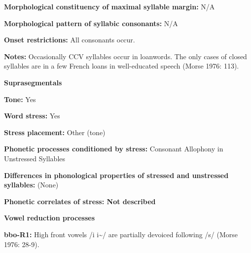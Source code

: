 \begin{styleBody}
\textbf{Morphological constituency of maximal syllable margin:} N/A
\end{styleBody}

\begin{styleBody}
\textbf{Morphological pattern of syllabic consonants:} N/A
\end{styleBody}

\begin{styleBody}
\textbf{Onset restrictions:} All consonants occur.
\end{styleBody}

\begin{styleBody}
\textbf{Notes: }Occasionally CCV syllables occur in loanwords. The only cases of closed syllables are in a few French loans in well-educated speech (Morse 1976: 113).
\end{styleBody}

\begin{styleBody}
\textbf{Suprasegmentals}
\end{styleBody}

\begin{styleBody}
\textbf{Tone:} Yes
\end{styleBody}

\begin{styleBody}
\textbf{Word stress:} Yes
\end{styleBody}

\begin{styleBody}
\textbf{Stress placement:} Other (tone)
\end{styleBody}

\begin{styleBody}
\textbf{Phonetic processes conditioned by stress:} Consonant Allophony in Unstressed Syllables
\end{styleBody}

\begin{styleBody}
\textbf{Differences in phonological properties of stressed and unstressed syllables:} (None)
\end{styleBody}

\begin{styleBody}
\textbf{Phonetic correlates of stress: Not described}
\end{styleBody}

\begin{styleBody}
\textbf{Vowel reduction processes}
\end{styleBody}

\begin{styleBody}
\textbf{bbo-R1: }High front vowels /i i\~{ }/ are partially devoiced following /s/ (Morse 1976: 28-9).
\end{styleBody}

